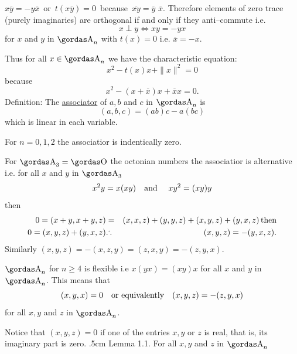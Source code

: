 $x\overline{y}=-y\overline{x}\,$ or $\,t(x\overline{y})=0\,$ because
$\,\overline{xy} = \overline{y}\,\,\overline{x}$.
Therefore elements of zero trace (purely imaginaries) are orthogonal if and 
only if they anti--commute i.e. 
$$x\perp y\Longleftrightarrow xy=-yx$$ 
for
$x$ and $y$ in $\a_{n}$ with $t(x)=0$ i.e. $\overline{x}=-x$. 
\par 
Thus for all
$x\in \a_{n}$ we have the characteristic equation:
$$x^{2}-t(x)x+\parallel x\parallel^{2}=0$$
because
$$x^{2}-(x+\overline{x})x+\overline{x}x=0.$$
{\bsbf Definition:} The \underline{associator} of $a,b$ and $c$ in $\a_{n}$ is
$$(a,b,c)=(ab)c-a(bc)$$
which is linear in each variable.
\par 
For $n=0,1,2$ the associatior is indentically zero.
\par 
For $\a_{3}=\o$ the octonian numbers the associatior is alternative
i.e. for all $x$ and $y$ in $\a_{3}$%
$$x^{2}y=x(xy)\quad\hbox{\rm and }\quad xy^{2}=(xy)y$$ 
then
\begin{eqnarray*}
0=(x+y,x+y,z)&=&(x,x,z)+(y,y,z)+(x,y,z)+(y,x,z)\, \hbox{\bs then}\\
0=(x,y,z)+(y,x,z)&\triangulo &(x,y,z)=-(y,x,z).
\end{eqnarray*}
Similarly $(x,y,z)=-(x,z,y)=(z,x,y)=-(z,y,x)$.
\par 
$\a_{n}$ for $n\ge 4$ is flexible i.e
$x(yx)=(xy)x$ for all $x$ and $y$ in $\a_{n}$. This means that 
$$(x,y,x)=0\quad\hbox{\rm or equivalently}\quad (x,y,z)=-(z,y,x)$$
for all $x, y$ and $z$ in $\a_{n}$.
\par 
Notice that $(x,y,z)=0$ if one of the entries 
$x,y$ or $z$ is real, that is, its imaginary part is zero.
\vglue.5cm
\noindent
{\bsbf Lemma 1.1.} For all $x,y$ and $z$ in $\a_{n}$


